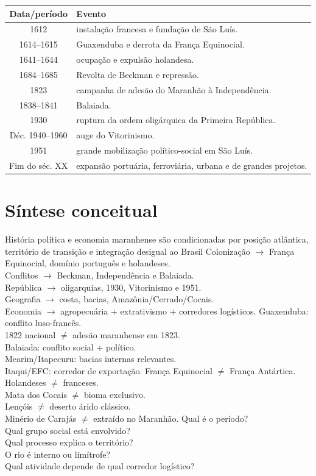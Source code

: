 \begin{center}
\begin{tabularx}{\textwidth}{c X}
\toprule
Data/período & Evento \\
\midrule
1612 & instalação francesa e fundação de São Luís. \\
1614--1615 & Guaxenduba e derrota da França Equinocial. \\
1641--1644 & ocupação e expulsão holandesa. \\
1684--1685 & Revolta de Beckman e repressão. \\
1823 & campanha de adesão do Maranhão à Independência. \\
1838--1841 & Balaiada. \\
1930 & ruptura da ordem oligárquica da Primeira República. \\
Déc. 1940--1960 & auge do Vitorinismo. \\
1951 & grande mobilização político-social em São Luís. \\
Fim do séc. XX & expansão portuária, ferroviária, urbana e de grandes projetos. \\
\bottomrule
\end{tabularx}
\end{center}

\section{Síntese conceitual}

{História política e economia maranhense são condicionadas por posição atlântica, território de transição e integração desigual ao Brasil}
{Colonização $\rightarrow$ França Equinocial, domínio português e holandeses.\\Conflitos $\rightarrow$ Beckman, Independência e Balaiada.\\República $\rightarrow$ oligarquias, 1930, Vitorinismo e 1951.\\Geografia $\rightarrow$ costa, bacias, Amazônia/Cerrado/Cocais.\\Economia $\rightarrow$ agropecuária + extrativismo + corredores logísticos.}
{Guaxenduba: conflito luso-francês.\\1822 nacional $\neq$ adesão maranhense em 1823.\\Balaiada: conflito social + político.\\Mearim/Itapecuru: bacias internas relevantes.\\Itaqui/EFC: corredor de exportação.}
{França Equinocial $\neq$ França Antártica.\\Holandeses $\neq$ franceses.\\Mata dos Cocais $\neq$ bioma exclusivo.\\Lençóis $\neq$ deserto árido clássico.\\Minério de Carajás $\neq$ extraído no Maranhão.}
{Qual é o período?\\Qual grupo social está envolvido?\\Qual processo explica o território?\\O rio é interno ou limítrofe?\\Qual atividade depende de qual corredor logístico?}

